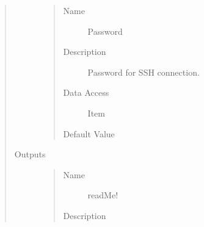 \documentclass[letterpaper,10pt,english]{sphinxmanual}
\begin{document}
\begin{quote}
\begin{description}
\begin{quote}
\begin{description}
\item[{Name}] \leavevmode
Password

\item[{Description}] \leavevmode
Password for SSH connection.

\item[{Data Access}] \leavevmode
Item

\item[{Default Value}] \leavevmode
{}

\end{description}\end{quote}

\item[{Outputs}] \leavevmode\begin{quote}\begin{description}
\item[{Name}] \leavevmode
readMe!

\item[{Description}] \leavevmode
{}

\end{description}\end{quote}

\end{description}\end{quote}
\end{document}

